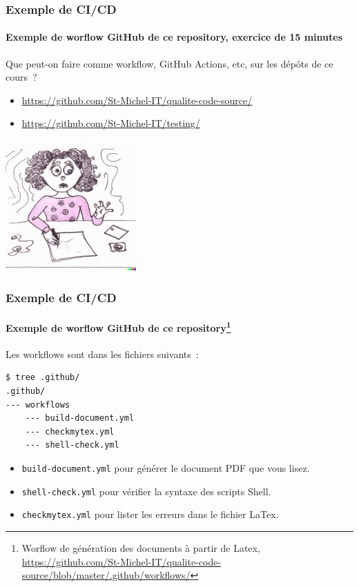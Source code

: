 \documentclass{beamer}
\begin{document}
    \begin{frame}
        \frametitle{Exemple de CI/CD}
        \framesubtitle{Exemple de worflow GitHub de ce repository, exercice de 15 minutes}
        \transdissolve
        Que peut-on faire comme workflow, GitHub Actions, etc, sur les dépôts de ce cours~?
        \begin{itemize}
            \item \url{https://github.com/St-Michel-IT/qualite-code-source/}
            \item \url{https://github.com/St-Michel-IT/testing/}
        \end{itemize}
        \bigbreak
        \centering
        \includegraphics[width=5cm]{image/young-praticing-her-homework.png}
    \end{frame}

    \begin{frame}[fragile]
        \frametitle{Exemple de CI/CD}
        \framesubtitle{Exemple de worflow GitHub de ce repository{\footnote{Worflow de génération des documents à partir de Latex, \url{https://github.com/St-Michel-IT/qualite-code-source/blob/master/.github/workflows/}}}}
        \transdissolve
        Les workflows sont dans les fichiers suivants~:
        \begin{lstlisting}[language=sh]
$ tree .github/
.github/
--- workflows
    --- build-document.yml
    --- checkmytex.yml
    --- shell-check.yml
        \end{lstlisting}
        \begin{itemize}
            \item \lstinline{build-document.yml} pour générer le document PDF que vous lisez.
            \item \lstinline{shell-check.yml} pour vérifier la syntaxe des scripts Shell.
            \item \lstinline{checkmytex.yml} pour lister les erreurs dans le fichier LaTex.
        \end{itemize}
    \end{frame}
\end{document}
